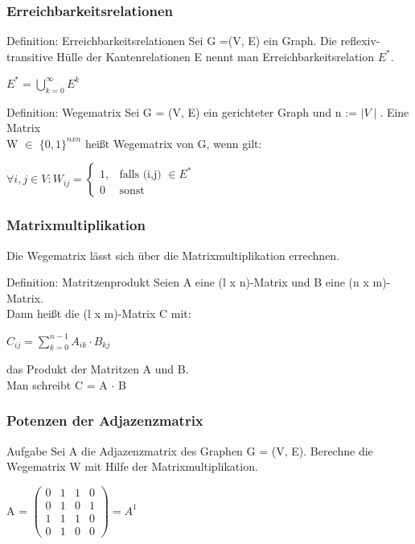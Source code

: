 \documentclass{beamer}
\begin{document}
\begin{frame}
	\frametitle{Erreichbarkeitsrelationen}
	\begin{block}{Definition: Erreichbarkeitsrelationen}
		Sei G =(V, E) ein Graph. Die reflexiv-transitive H\"ulle der Kantenrelationen E nennt man Erreichbarkeitsrelation $E^*$.				\\
		\begin{center}
		$E^* = \bigcup_{k = 0}^\infty E^k$
		\end{center}
	\end{block}

	\begin{block}{Definition: Wegematrix}
		Sei G = (V, E) ein gerichteter Graph und n := $\mid V \mid$. Eine Matrix \\
		W $\in$ $\{0, 1\}^{n x n}$ hei{\ss}t Wegematrix von G, wenn gilt: \\
		\begin{center}
			$\forall i, j \in V : W_{ij} = 
			\begin{cases}
				 1,  & \text{falls (i,j) $\in E^*$}\\
				 0  & \text{sonst}
			\end{cases}$
		\end{center}
	\end{block}
\end{frame}

\begin{frame}
	\frametitle{Matrixmultiplikation}
	Die Wegematrix l\"asst sich \"uber die Matrixmultiplikation errechnen.
	\begin{block} {Definition: Matritzenprodukt}
		Seien A eine (l x n)-Matrix und B eine (n x m)-Matrix. \\
		Dann hei{\ss}t die (l x m)-Matrix C mit:\\
		\begin{center}
			$C_{ij} = \sum_{k=0}^{n-1} A_{ik} \cdot B_{kj}$
		\end{center}
		das Produkt der Matritzen A und B.\\
		Man schreibt C = A $\cdot$ B
	\end{block}
\end{frame}

\begin{frame}
	\frametitle{Potenzen der Adjazenzmatrix}
	\begin{block}{Aufgabe}
		Sei A die Adjazenzmatrix des Graphen G = (V, E). Berechne die Wegematrix W mit Hilfe der Matrixmultiplikation. \\
				
			\begin{center}
			A =	
			$\begin{pmatrix}
				 0 & 1 & 1 & 0\\
				 0 & 1 & 0 & 1\\
				 1 & 1 & 1 & 0\\
				 0 & 1 & 0 & 0
			\end{pmatrix}
			=A^1$
		\end{center}
	

	
		
	\end{block}
\end{frame}
\end{document}

